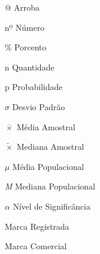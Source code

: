 \begin{simbolos}
  \item[@] Arroba
  \item[nº] Número
  \item[\%] Porcento 
  \item[n] Quantidade
  \item[p] Probabilidade
  \item[$\sigma$] Desvio Padrão
  \item[$\overline{\times}$] Média Amostral
  \item[$\tilde{\times}$] Mediana Amostral
  \item[$\mu$] Média Populacional
  \item[\textit{M}] Mediana Populacional
  \item[$\alpha$] Nível de Significância 
  \item[\textregistered] Marca Registrada
  \item[\texttrademark] Marca Comercial
\end{simbolos}

